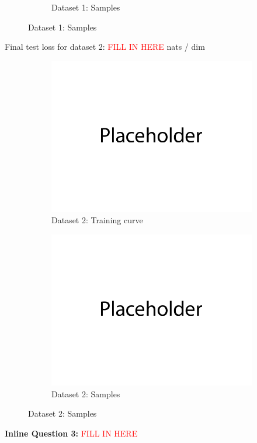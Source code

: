 \documentclass{article}
\begin{document}
\begin{enumerate}[(a)]
\begin{figure}[H]
\begin{subfigure}{0.45\textwidth}
        \caption{Dataset 1: Samples}
    \end{subfigure}
\end{figure}
Final test loss for dataset 2: \textcolor{red}{FILL IN HERE}  nats / dim
\begin{figure}[H]
    \centering
    \begin{subfigure}{0.45\textwidth}
        \centering
        \includegraphics[width=\textwidth]{figures/placeholder.png}
        \caption{Dataset 2: Training curve}
    \end{subfigure}
    \hspace{0.2in}
    \begin{subfigure}{0.45\textwidth}
        \centering
        \includegraphics[width=\textwidth]{figures/placeholder.png}
        \caption{Dataset 2: Samples}
    \end{subfigure}
\end{figure}
\textbf{Inline Question 3:} \textcolor{red}{FILL IN HERE}


\end{enumerate}
\end{document}
